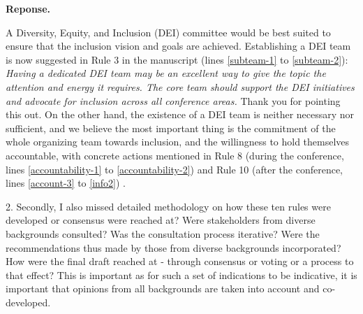 \documentclass{article}
\newenvironment{Reply}{\noindent\color{BlueViolet}\textbf{Reponse.}}{\vspace{1em}}
\begin{document}
\begin{Reply}

    A Diversity, Equity, and Inclusion (DEI) committee would be best suited to ensure that the inclusion vision and goals are achieved. 
    Establishing a DEI team is now suggested in Rule 3 in the manuscript (lines \ref{subteam-1} to \ref{subteam-2}):
    \textit{ 
    Having a dedicated DEI team may be an excellent way to give the topic the attention and energy it requires.
    The core team should support the DEI initiatives and advocate for inclusion across all conference areas.} 
    Thank you for pointing this out. 
    On the other hand, the existence of a DEI team is neither necessary nor sufficient, and we believe the most important thing is the commitment of the 
    whole organizing team towards inclusion, and the willingness to hold themselves accountable, with concrete actions mentioned in Rule 8 (during the conference, lines \ref{accountability-1} to \ref{accountability-2}) and Rule 10 (after the conference, lines \ref{account-3} to \ref{info2}) .
    
\end{Reply}

2. Secondly, I also missed detailed methodology on how these ten rules were developed or consensus were reached at? Were stakeholders from diverse backgrounds consulted? Was the consultation process iterative? Were the recommendations thus made by those from diverse backgrounds incorporated? How were the final draft reached at - through consensus or voting or a process to that effect? This is important as for such a set of indications to be indicative, it is important that opinions from all backgrounds are taken into account and co-developed.
\end{document}
